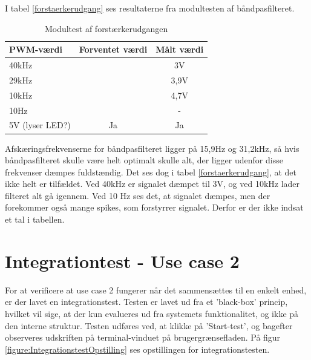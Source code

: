 I tabel \ref{forstaerkerudgang} ses resultaterne fra modultesten af båndpasfilteret. 

\begin{table}[H]
	\centering
	\begin{tabular}{|l|c|c|}
		\hline
		\textbf{PWM-værdi} & \textbf{Forventet værdi} & \textbf{Målt værdi} \\ \hline
		40kHz              & \multicolumn{1}{l|}{}    & 3V                  \\ \hline
		29kHz              & \multicolumn{1}{l|}{}    & 3,9V                \\ \hline
		10kHz              & \multicolumn{1}{l|}{}    & 4,7V                \\ \hline
		10Hz               & \multicolumn{1}{l|}{}    & -                   \\ \hline
		5V (lyser LED?)    & Ja                       & Ja                  \\ \hline
	\end{tabular}
	\caption{Modultest af forstærkerudgangen}
	\label{table:forstaerkerudgang}
\end{table}

Afskæringsfrekvenserne for båndpasfilteret ligger på 15,9Hz og 31,2kHz, så hvis båndpasfilteret skulle være helt optimalt skulle alt, der ligger udenfor disse frekvenser dæmpes fuldstændig. Det ses dog i tabel \ref{forstaerkerudgang}, at det ikke helt er tilfældet. Ved 40kHz er signalet dæmpet til 3V, og ved 10kHz lader filteret alt gå igennem. Ved 10 Hz ses det, at signalet dæmpes, men der forekommer også mange spikes, som forstyrrer signalet. Derfor er der ikke indsat et tal i tabellen. 

\section{Integrationtest - Use case 2}
For at verificere at use case 2 fungerer når det sammensættes til en enkelt enhed, er der lavet en integrationstest. Testen er lavet ud fra et 'black-box' princip, hvilket vil sige, at der kun evalueres ud fra systemets funktionalitet, og ikke på den interne struktur.
Testen udføres ved, at klikke på 'Start-test', og bagefter observeres udskriften på terminal-vinduet på brugergrænsefladen. På figur \ref{figure:IntegrationstestOpstilling} ses opstillingen for integrationstesten.

